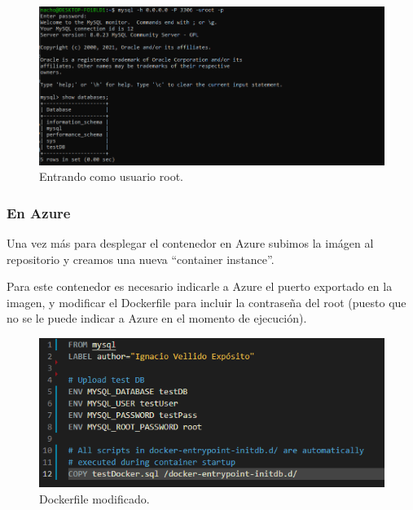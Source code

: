 \begin{figure}[H]\center\includegraphics[width=.95\linewidth]{img/sgbd/s1.png}\caption{Entrando como usuario root.}\end{figure}

\subsubsection{En Azure}

Una vez más para desplegar el contenedor en Azure subimos la imágen al repositorio y creamos una nueva ``container instance''.

\vspace{\baselineskip}

Para este contenedor es necesario indicarle a Azure el puerto exportado en la imagen, y modificar el Dockerfile para incluir la contraseña del root (puesto que no se le puede indicar a Azure en el momento de ejecución).

\begin{figure}[H]\center\includegraphics[width=.95\linewidth]{img/sgbd/s9.png}\caption{Dockerfile modificado.}\end{figure}

